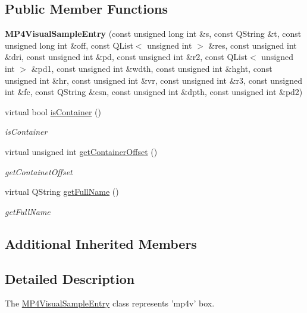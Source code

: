 \subsection*{Public Member Functions}
\begin{DoxyCompactItemize}
\item 
\hypertarget{class_m_p4_visual_sample_entry_ae211ead3bb5bd22b369e217d2586bb8b}{{\bfseries M\-P4\-Visual\-Sample\-Entry} (const unsigned long int \&s, const Q\-String \&t, const unsigned long int \&off, const Q\-List$<$ unsigned int $>$ \&res, const unsigned int \&dri, const unsigned int \&pd, const unsigned int \&r2, const Q\-List$<$ unsigned int $>$ \&pd1, const unsigned int \&wdth, const unsigned int \&hght, const unsigned int \&hr, const unsigned int \&vr, const unsigned int \&r3, const unsigned int \&fc, const Q\-String \&csn, const unsigned int \&dpth, const unsigned int \&pd2)}\label{class_m_p4_visual_sample_entry_ae211ead3bb5bd22b369e217d2586bb8b}

\item 
virtual bool \hyperlink{class_m_p4_visual_sample_entry_aa683a32a4491a554bfc03b0fe1197bfc}{is\-Container} ()
\begin{DoxyCompactList}\small\item\em is\-Container \end{DoxyCompactList}\item 
virtual unsigned int \hyperlink{class_m_p4_visual_sample_entry_a5ef15604b8bd6d3626dcbef1698346a9}{get\-Container\-Offset} ()
\begin{DoxyCompactList}\small\item\em get\-Containet\-Offset \end{DoxyCompactList}\item 
virtual Q\-String \hyperlink{class_m_p4_visual_sample_entry_a82117470bd8bbda71839fff2b9a069c6}{get\-Full\-Name} ()
\begin{DoxyCompactList}\small\item\em get\-Full\-Name \end{DoxyCompactList}\end{DoxyCompactItemize}
\subsection*{Additional Inherited Members}


\subsection{Detailed Description}
The \hyperlink{class_m_p4_visual_sample_entry}{M\-P4\-Visual\-Sample\-Entry} class represents 'mp4v' box. 

